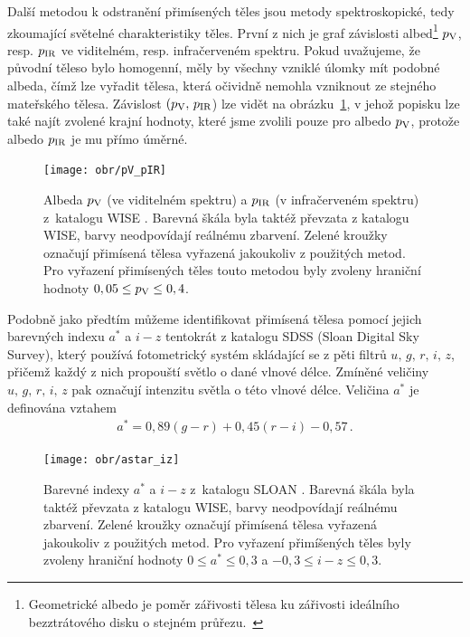 \documentclass[A4paper, 12pt, oneside]{book}
\begin{document}
Další metodou k odstranění přimísených těles jsou metody spektroskopické, tedy zkoumající světelné charakteristiky těles. První z nich je graf závislosti albed\footnote{Geometrické albedo je poměr zářivosti tělesa ku zářivosti ideálního bezztrátového disku o stejném průřezu.~\cite{fmt}} $p_{\rm V}$, resp. $p_{\rm IR}$ ve viditelném, resp. infračerveném spektru. Pokud uvažujeme, že původní těleso bylo homogenní, měly by všechny vzniklé úlomky mít podobné albeda, čímž lze vyřadit tělesa, která očividně nemohla vzniknout ze stejného mateřského tělesa. Závislost $(p_{\rm V},\,p_{\rm IR}$) lze vidět na obrázku~\ref{fig:pV_pIR}, v jehož popisku lze také najít zvolené krajní hodnoty, které jsme zvolili pouze pro albedo $p_{\rm V}$, protože albedo $p_{\rm IR}$ je mu přímo úměrné.

\begin{figure}
	\centering
	\texttt{[image: obr/pV\_pIR]}
	\caption{Albeda $p_{\rm V}$ (ve viditelném spektru) a $p_{\rm IR}$ (v infračerveném spektru) z~katalogu WISE \cite{nugent15}. Barevná škála byla taktéž převzata z katalogu WISE, barvy neodpovídají reálnému zbarvení. Zelené kroužky označují přimísená tělesa vyřazená jakoukoliv z použitých metod. Pro vyřazení přimísených těles touto metodou byly zvoleny hraniční hodnoty $0,05 \leq p_{\rm V} \leq 0,4$.}
	\label{fig:pV_pIR}
\end{figure}

Podobně jako předtím můžeme identifikovat přimísená tělesa pomocí jejich barevných indexu $a^*$ a $i-z$ tentokrát z katalogu SDSS (Sloan Digital Sky Survey), který používá fotometrický systém skládající se z pěti filtrů $u,\,g,\,r,\,i,\,z$, přičemž každý z nich propouští světlo o dané vlnové délce. Zmíněné veličiny $u,\,g,\,r,\,i,\,z$ pak označují intenzitu světla o této vlnové délce. Veličina $a^*$ je definována vztahem~\cite{ivezic01}
\begin{align}
	a^ *= 0,89 (g - r) + 0,45 (r - i) - 0,57\,.
\end{align}
\begin{figure}
	\centering
	\texttt{[image: obr/astar\_iz]}
	\caption{Barevné indexy $a^*$ a $i-z$ z~katalogu SLOAN \cite{ivezic01}. Barevná škála byla taktéž převzata z katalogu WISE, barvy neodpovídají reálnému zbarvení. Zelené kroužky označují přimísená tělesa vyřazená jakoukoliv z použitých metod. Pro vyřazení přimíšených těles byly zvoleny hraniční hodnoty $0\leq a^* \leq 0,3$ a $-0,3\leq i-z \leq 0,3$.}
	\label{fig:astar_iz}
\end{figure}
\pagebreak
\end{document}
